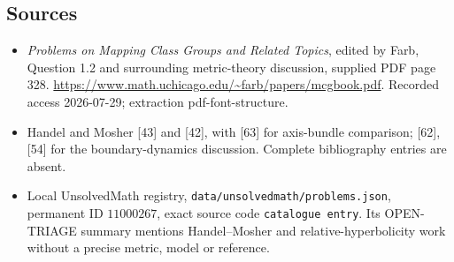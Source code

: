 \documentclass[11pt]{article}
\begin{document}
\subsection{Sources}
\begin{itemize}
\item \emph{Problems on Mapping Class Groups and Related Topics}, edited by Farb, Question 1.2 and surrounding metric-theory discussion, supplied PDF page 328. \url{https://www.math.uchicago.edu/~farb/papers/mcgbook.pdf}. Recorded access 2026-07-29; extraction pdf-font-structure.
\item Handel and Mosher [43] and [42], with [63] for axis-bundle comparison; [62], [54] for the boundary-dynamics discussion. Complete bibliography entries are absent.
\item Local UnsolvedMath registry, \texttt{data/unsolvedmath/problems.json}, permanent ID \(11000267\), exact source code \texttt{catalogue entry}. Its OPEN-TRIAGE summary mentions Handel--Mosher and relative-hyperbolicity work without a precise metric, model or reference.
\end{itemize}
\end{document}
